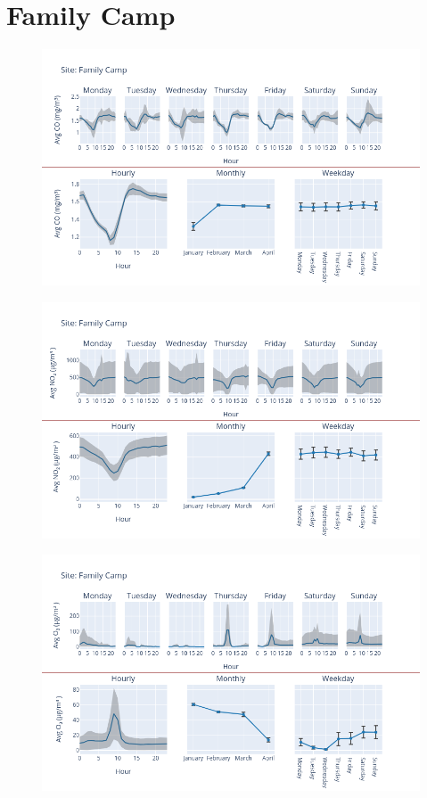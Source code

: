 \documentclass[12pt, oneside]{book}
\begin{document}
{\section{Family Camp}
{\begin{figure}[H] 
 \centering 
\includegraphics[width=.88\textwidth, keepaspectratio]{image74} 
 \end{figure}}{} 

{\begin{figure}[H] 
 \centering 
\includegraphics[width=.88\textwidth, keepaspectratio]{image75} 
 \end{figure}}{} 

{\begin{figure}[H] 
 \centering 
\includegraphics[width=.88\textwidth, keepaspectratio]{image76} 
 \end{figure}}{} 

}
\end{document}
